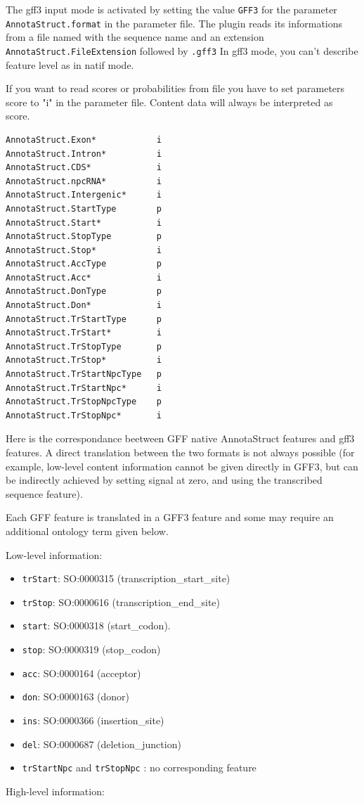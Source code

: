 The gff3 input mode is activated by setting the value \texttt{GFF3}
for the parameter \texttt{AnnotaStruct.format} in the parameter file.
The plugin reads its informations from a file named with the sequence
name and an extension \texttt{AnnotaStruct.FileExtension} followed by
\texttt{.gff3} In gff3 mode, you can't describe feature level as in
natif mode.

If you want to read scores or probabilities from file you have to set
parameters score to "i" in the parameter file.  Content data will
always be interpreted as score.
\begin{Verbatim}[fontsize=\small]
AnnotaStruct.Exon*            i
AnnotaStruct.Intron*          i
AnnotaStruct.CDS*             i
AnnotaStruct.npcRNA*          i
AnnotaStruct.Intergenic*      i	
AnnotaStruct.StartType        p 
AnnotaStruct.Start*           i
AnnotaStruct.StopType         p 
AnnotaStruct.Stop*            i
AnnotaStruct.AccType          p 
AnnotaStruct.Acc*             i
AnnotaStruct.DonType          p 
AnnotaStruct.Don*             i
AnnotaStruct.TrStartType      p 
AnnotaStruct.TrStart*         i
AnnotaStruct.TrStopType       p 
AnnotaStruct.TrStop*          i
AnnotaStruct.TrStartNpcType   p
AnnotaStruct.TrStartNpc*      i
AnnotaStruct.TrStopNpcType    p  
AnnotaStruct.TrStopNpc*       i
\end{Verbatim}

Here is the correspondance beetween GFF native AnnotaStruct features
and gff3 features. A direct translation between the two formats is not
always possible (for example, low-level content information cannot be
given directly in GFF3, but can be indirectly achieved by setting
signal at zero, and using the transcribed sequence feature).

Each GFF feature is translated in a GFF3 feature and some may
require an additional ontology term given below.

Low-level information:
\begin{itemize}
\item \texttt{trStart}: 	SO:0000315 (transcription\_start\_site)
\item \texttt{trStop}: 	SO:0000616 (transcription\_end\_site)
\item \texttt{start}: 	SO:0000318 (start\_codon).
\item \texttt{stop}: 	SO:0000319 (stop\_codon)
\item \texttt{acc}: 	SO:0000164 (acceptor)
\item \texttt{don}: 	SO:0000163 (donor)
\item \texttt{ins}: 	SO:0000366 (insertion\_site)
\item \texttt{del}: 	SO:0000687 (deletion\_junction)
\item \texttt{trStartNpc} and \texttt{trStopNpc} : no corresponding feature
\end{itemize}
High-level information:

